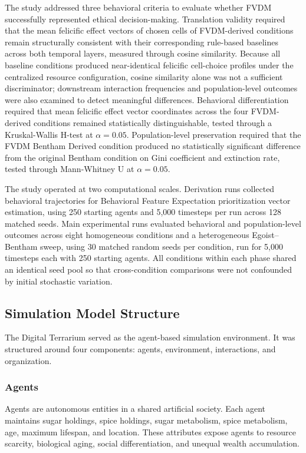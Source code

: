 \documentclass{icsthesis}
\begin{document}
\begin{mainmatter}
The study addressed three behavioral criteria to evaluate whether FVDM successfully represented ethical decision-making. Translation validity required that the mean felicific effect vectors of chosen cells of FVDM-derived conditions remain structurally consistent with their corresponding rule-based baselines across both temporal layers, measured through cosine similarity. Because all baseline conditions produced near-identical felicific cell-choice profiles under the centralized resource configuration, cosine similarity alone was not a sufficient discriminator; downstream interaction frequencies and population-level outcomes were also examined to detect meaningful differences. Behavioral differentiation required that mean felicific effect vector coordinates across the four FVDM-derived conditions remained statistically distinguishable, tested through a Kruskal-Wallis H-test at $\alpha = 0.05$. Population-level preservation required that the FVDM Bentham Derived condition produced no statistically significant difference from the original Bentham condition on Gini coefficient and extinction rate, tested through Mann-Whitney U at $\alpha = 0.05$.

The study operated at two computational scales. Derivation runs collected behavioral trajectories for Behavioral Feature Expectation prioritization vector estimation, using 250 starting agents and 5{,}000 timesteps per run across 128 matched seeds. Main experimental runs evaluated behavioral and population-level outcomes across eight homogeneous conditions and a heterogeneous Egoist--Bentham sweep, using 30 matched random seeds per condition, run for 5,000 timesteps each with 250 starting agents. All conditions within each phase shared an identical seed pool so that cross-condition comparisons were not confounded by initial stochastic variation.

\subsection{Simulation Model Structure}
The Digital Terrarium served as the agent-based simulation environment. It was structured around four components: agents, environment, interactions, and organization.

\subsubsection{Agents}
Agents are autonomous entities in a shared artificial society. Each agent maintains sugar holdings, spice holdings, sugar metabolism, spice metabolism, age, maximum lifespan, and location. These attributes expose agents to resource scarcity, biological aging, social differentiation, and unequal wealth accumulation.


\end{mainmatter}
\end{document}
